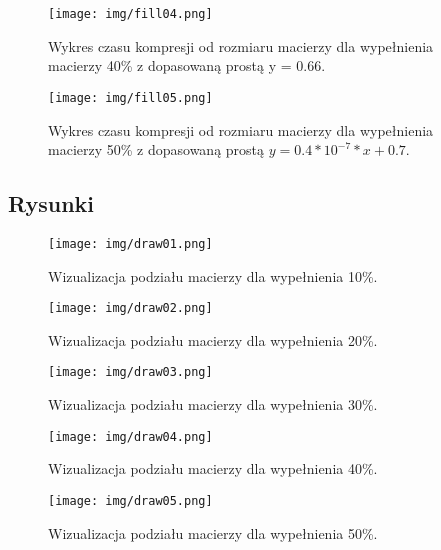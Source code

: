 \documentclass{article}
\begin{document}
\begin{figure}[H]
    \captionsetup{justification=centering}
    \centering
  \texttt{[image: img/fill04.png]}
  \caption{Wykres czasu kompresji od rozmiaru macierzy dla wypełnienia macierzy 40\% z dopasowaną prostą y = 0.66.}
\end{figure}

\begin{figure}[H]
    \captionsetup{justification=centering}
    \centering
  \texttt{[image: img/fill05.png]}
  \caption{Wykres czasu kompresji od rozmiaru macierzy dla wypełnienia macierzy 50\% z dopasowaną prostą $y = 0.4 * 10^{-7} * x + 0.7$.}
\end{figure}

\subsection{Rysunki}

\begin{figure}[H]
    \captionsetup{justification=centering}
    \centering
  \texttt{[image: img/draw01.png]}
  \caption{Wizualizacja podziału macierzy dla wypełnienia 10\%.}
\end{figure}

\begin{figure}[H]
    \captionsetup{justification=centering}
    \centering
  \texttt{[image: img/draw02.png]}
  \caption{Wizualizacja podziału macierzy dla wypełnienia 20\%.}
\end{figure}

\begin{figure}[H]
    \captionsetup{justification=centering}
    \centering
  \texttt{[image: img/draw03.png]}
  \caption{Wizualizacja podziału macierzy dla wypełnienia 30\%.}
\end{figure}

\begin{figure}[H]
    \captionsetup{justification=centering}
    \centering
  \texttt{[image: img/draw04.png]}
  \caption{Wizualizacja podziału macierzy dla wypełnienia 40\%.}
\end{figure}

\begin{figure}[H]
    \captionsetup{justification=centering}
    \centering
  \texttt{[image: img/draw05.png]}
  \caption{Wizualizacja podziału macierzy dla wypełnienia 50\%.}
\end{figure}
\end{document}
